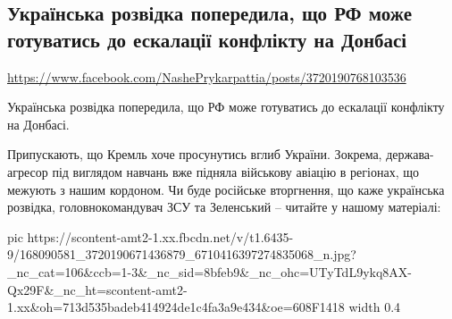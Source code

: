  
 
 
 
 

\subsection{Українська розвідка попередила, що РФ може готуватись до ескалації конфлікту на Донбасі}
\label{sec:02_04_2021.fb.nashe_prykarpattia.1.rossia_donbass_vtorzhenie}
\url{https://www.facebook.com/NashePrykarpattia/posts/3720190768103536}

Українська розвідка попередила, що РФ може готуватись до ескалації конфлікту на
Донбасі.  

Припускають, що Кремль хоче просунутись вглиб України. Зокрема, держава-агресор
під виглядом навчань вже підняла військову авіацію в регіонах, що межують з
нашим кордоном.  Чи буде російське вторгнення, що каже українська розвідка,
головнокомандувач ЗСУ та Зеленський – читайте у нашому матеріалі:


\ifcmt
  pic https://scontent-amt2-1.xx.fbcdn.net/v/t1.6435-9/168090581_3720190671436879_6710416397274835068_n.jpg?_nc_cat=106&ccb=1-3&_nc_sid=8bfeb9&_nc_ohc=UTyTdL9ykq8AX-Qx29F&_nc_ht=scontent-amt2-1.xx&oh=713d535badeb414924de1c4fa3a9e434&oe=608F1418
  width 0.4
\fi

